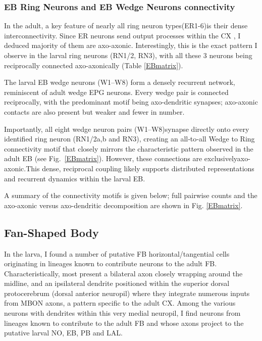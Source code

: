         \subsubsection{EB Ring Neurons and EB Wedge Neurons connectivity}
            In the adult, a key feature of nearly all ring neuron types(ER1-6)is their dense interconnectivity. Since ER neurons send output processes within the CX \citep{hulse2021connectome}, I deduced majority of them are axo-axonic. Interestingly, this is the exact pattern I observe in the larval ring neurons (RN1/2, RN3), with all these 3 neurons being reciprocally connected axo-axonically (Table \ref{EBmatrix}). 

            The larval EB wedge neurons (W1–W8) form a densely recurrent network, reminiscent of adult wedge EPG neurons. Every wedge pair is connected reciprocally, with the predominant motif being axo-dendritic synapses; axo-axonic contacts are also present but weaker and fewer in number. 

            Importantly, all eight wedge neuron pairs (W1–W8)synapse directly onto every identified ring neuron (RN1/2a,b and RN3), creating an all‑to‑all Wedge to Ring connectivity motif that closely mirrors the characteristic pattern observed in the adult EB (see Fig.~\ref{EBmatrix}). However, these connections are exclusivelyaxo-axonic.This dense, reciprocal coupling likely supports distributed representations and recurrent dynamics within the larval EB. 

            A summary of the connectivity motifs is given below; full pairwise counts and the axo-axonic versus axo-dendritic decomposition are shown in Fig. \ref{EBmatrix}. 

    \subsection{Fan-Shaped Body}
        In the larva, I found a number of putative FB horizontal/tangential cells originating in lineages known to contribute neurons to the adult FB. Characteristically, most present a bilateral axon closely wrapping around the midline, and an ipsilateral dendrite positioned within the superior dorsal protocerebrum (dorsal anterior neuropil) where they integrate numerous inputs from MBON axons, a pattern specific to the adult CX. Among the various neurons with dendrites within this very medial neuropil, I find neurons from lineages known to contribute to the adult FB and whose axons project to the putative larval NO, EB, PB and LAL.
